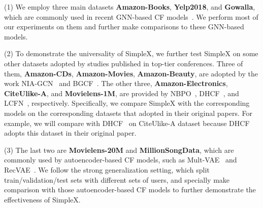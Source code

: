 \documentclass[sigconf,authorversion]{acmart}
\begin{document}
(1) We employ three main datasets \textbf{Amazon-Books}, \textbf{Yelp2018}, and \textbf{Gowalla}, which are commonly used in recent GNN-based CF models~\cite{NGCF, LR-GCCF, LightGCN, DGCF, NGAT4Rec, SGL-ED}. We perform most of our experiments on them and further make comparisons to these GNN-based models. 

    (2) To demonstrate the universality of SimpleX, we further test SimpleX on some other datasets adopted by studies published in top-tier conferences. Three of them, \textbf{Amazon-CDs}, \textbf{Amazon-Movies}, \textbf{Amazon-Beauty}, are adopted by the work NIA-GCN~\cite{NIA-GCN} and BGCF~\cite{BGCF}. The other three, \textbf{Amazon-Electronics}, \textbf{CiteUlike-A}, and \textbf{Movielens-1M}, are provided by NBPO~\cite{NBPO}, DHCF~\cite{DHCF}, and LCFN~\cite{LCFN}, respectively. 
Specifically, we compare SimpleX with the corresponding models on the corresponding datasets that adopted in their original papers. For example, we will compare with DHCF~\cite{DHCF} on CiteUlike-A dataset because DHCF adopts this dataset in their original paper.


(3) The last two are \textbf{Movielens-20M} and \textbf{MillionSongData}, which are commonly used by autoencoder-based CF models, such as Mult-VAE~\cite{MVAE} and RecVAE~\cite{RecVAE}.
We follow the strong generalization setting, which split train/validation/test sets with different sets of users, and specially make comparison with those autoencoder-based CF models to further demonstrate the effectiveness of SimpleX. 
\end{document}
